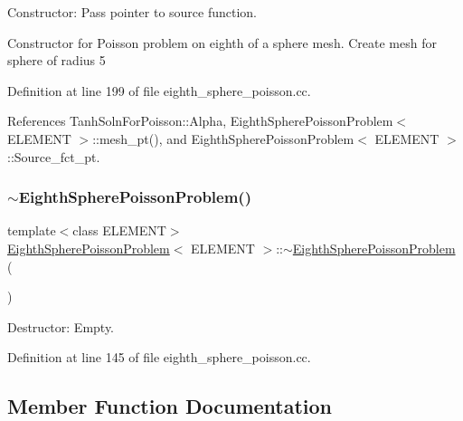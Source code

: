 Constructor\+: Pass pointer to source function. 

Constructor for Poisson problem on eighth of a sphere mesh. Create mesh for sphere of radius 5 

Definition at line 199 of file eighth\+\_\+sphere\+\_\+poisson.\+cc.



References Tanh\+Soln\+For\+Poisson\+::\+Alpha, Eighth\+Sphere\+Poisson\+Problem$<$ E\+L\+E\+M\+E\+N\+T $>$\+::mesh\+\_\+pt(), and Eighth\+Sphere\+Poisson\+Problem$<$ E\+L\+E\+M\+E\+N\+T $>$\+::\+Source\+\_\+fct\+\_\+pt.

\mbox{\label{classEighthSpherePoissonProblem_a043c7aa08c939fdc019870ad2c2270cc}} 
\subsubsection{\texorpdfstring{$\sim$\+Eighth\+Sphere\+Poisson\+Problem()}{~EighthSpherePoissonProblem()}}
{\footnotesize\ttfamily template$<$class E\+L\+E\+M\+E\+NT$>$ \\
\hyperlink{classEighthSpherePoissonProblem}{Eighth\+Sphere\+Poisson\+Problem}$<$ E\+L\+E\+M\+E\+NT $>$\+::$\sim$\hyperlink{classEighthSpherePoissonProblem}{Eighth\+Sphere\+Poisson\+Problem} (\begin{DoxyParamCaption}{ }\end{DoxyParamCaption})\hspace{0.3cm}{\ttfamily [inline]}}



Destructor\+: Empty. 



Definition at line 145 of file eighth\+\_\+sphere\+\_\+poisson.\+cc.



\subsection{Member Function Documentation}
\mbox{\label{classEighthSpherePoissonProblem_a480189fe5d2f42fe3ff6062d5f151ea3}} 
